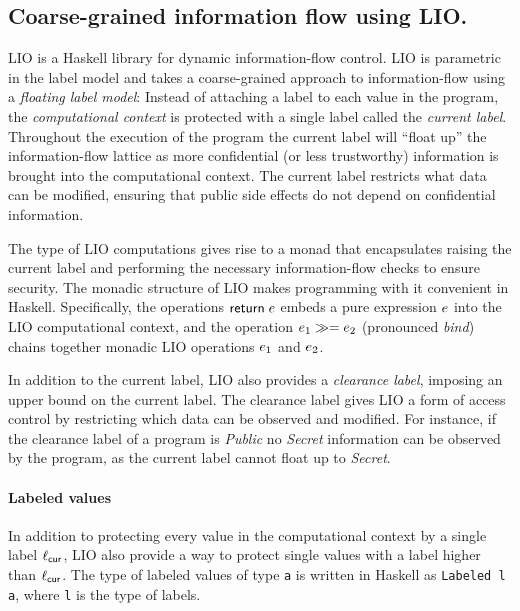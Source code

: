 \subsection{Coarse-grained information flow using LIO.}
LIO \cite{SRMMlio} is a Haskell library for dynamic information-flow control. LIO is parametric in the label model and takes a coarse-grained approach to information-flow using a \emph{floating label model}: Instead of attaching a label to each value in the program, the \emph{computational context} is protected with a single label called the \emph{current label}. Throughout the execution of the program the current label will ``float up'' the information-flow lattice as more confidential (or less trustworthy) information is brought into the computational context. The current label restricts what data can be modified, ensuring that public side effects do not depend on confidential information.

The type of LIO computations gives rise to a monad \cite{Wadler:1995:MFP:647698.734146} that encapsulates raising the current label and performing the necessary information-flow checks to ensure security. The monadic structure of LIO makes programming with it convenient in Haskell. Specifically, the operations $\mathsf{return}\;e$ embeds a pure expression $e$ into the LIO computational context, and the operation $e_1 \gg= e_2$ (pronounced \emph{bind}) chains together monadic LIO operations $e_1$ and $e_2$.

In addition to the current label, LIO also provides a \emph{clearance label}, imposing an upper bound on the current label. The clearance label gives LIO a form of access control by restricting which data can be observed and modified. For instance, if the clearance label of a program is \emph{Public} no \emph{Secret} information can be observed by the program, as the current label cannot float up to \emph{Secret}.

\paragraph{Labeled values}
In addition to protecting every value in the computational context by a single label $\ell_{\mathsf{cur}}$, LIO also provide a way to protect single values with a label higher than $\ell_{\mathsf{cur}}$. The type of labeled values of type \texttt{a} is written in Haskell as \texttt{Labeled l a}, where \texttt{l} is the type of labels.

